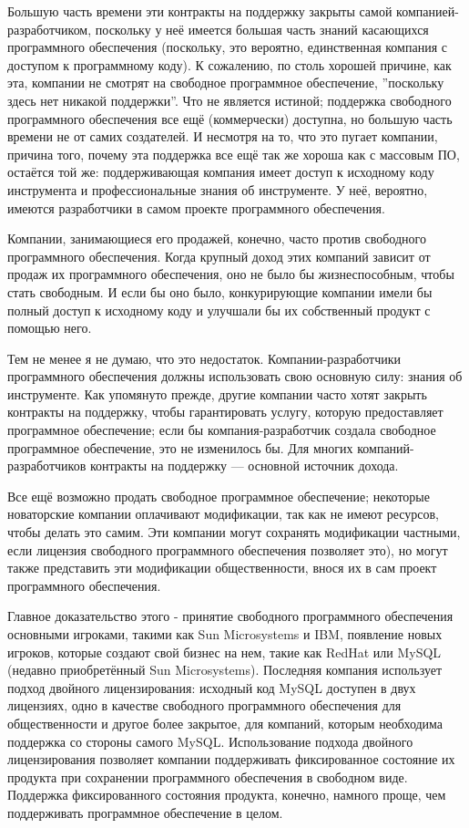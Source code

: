 \documentclass[12pt]{book}
\begin{document}
Большую часть времени эти контракты на поддержку закрыты самой компанией-разработчиком, поскольку у неё имеется большая часть знаний касающихся программного обеспечения (поскольку, это вероятно, единственная компания с доступом к программному коду). К сожалению, по столь хорошей причине, как эта, компании не смотрят на свободное программное обеспечение, ''поскольку здесь нет никакой поддержки''. Что не является истиной; поддержка свободного программного обеспечения все ещё (коммерчески) доступна, но большую часть времени не от самих создателей. И несмотря на то, что это пугает компании, причина того, почему эта поддержка все ещё так же хороша как с массовым ПО, остаётся той же: поддерживающая компания имеет доступ к исходному коду инструмента и профессиональные знания об инструменте. У неё, вероятно, имеются разработчики в самом проекте программного обеспечения.

Компании, занимающиеся его продажей, конечно, часто против свободного программного обеспечения. Когда крупный доход этих компаний зависит от продаж их программного обеспечения, оно не было бы жизнеспособным, чтобы стать свободным. И если бы оно было, конкурирующие компании имели бы полный доступ к исходному коду и улучшали бы их собственный продукт с помощью него.

Тем не менее я не думаю, что это недостаток. Компании-разработчики программного обеспечения должны использовать свою основную силу: знания об инструменте. Как упомянуто прежде, другие компании часто хотят закрыть контракты на поддержку, чтобы гарантировать услугу, которую предоставляет программное обеспечение; если бы компания-разработчик создала свободное программное обеспечение, это не изменилось бы. Для многих компаний-разработчи\-ков контракты на поддержку --- основной источник дохода.

Все ещё возможно продать свободное программное обеспечение; некоторые новаторские компании оплачивают модификации, так как не имеют ресурсов, чтобы делать это самим. Эти компании могут сохранять модификации частными, если лицензия свободного программного обеспечения позволяет это), но могут также представить эти модификации общественности, внося их в сам проект программного обеспечения.

Главное доказательство этого - принятие свободного программного обеспечения основными игроками, такими как Sun Microsystems и IBM, появление новых игроков, которые создают свой бизнес на нем, такие как RedHat или MySQL (недавно приобретённый Sun Microsystems). Последняя компания использует подход двойного лицензирования: исходный код MySQL доступен в двух лицензиях, одно в качестве свободного программного обеспечения для общественности и другое более закрытое, для компаний, которым необходима поддержка со стороны самого MySQL. Использование подхода двойного лицензирования позволяет компании поддерживать фиксированное состояние их продукта при сохранении программного обеспечения в свободном виде. Поддержка фиксированного состояния продукта, конечно, намного проще, чем поддерживать программное обеспечение в целом.
\end{document}
